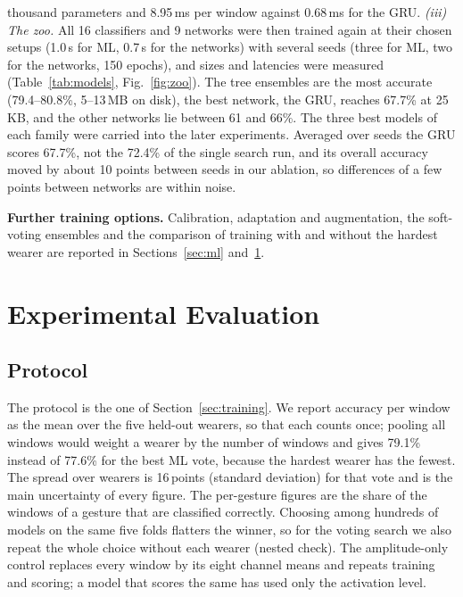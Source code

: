 \documentclass[conference]{IEEEtran}
\begin{document}
thousand parameters and 8.95\,ms per window against 0.68\,ms for the GRU.
\emph{(iii) The zoo.} All 16 classifiers and 9 networks were then trained again at
their chosen setups (1.0\,s for ML, 0.7\,s for the networks) with several seeds
(three for ML, two for the networks, 150 epochs), and sizes and latencies were
measured (Table~\ref{tab:models}, Fig.~\ref{fig:zoo}). The tree ensembles are the
most accurate (79.4--80.8\%, 5--13\,MB on disk), the best network, the GRU, reaches
67.7\% at 25\,KB, and the other networks lie between 61 and 66\%. The three best
models of each family were carried into the later experiments. Averaged over seeds
the GRU scores 67.7\%, not the 72.4\% of the single search run, and its overall
accuracy moved by about 10 points between seeds in our ablation, so differences of
a few points between networks are within noise.

\textbf{Further training options.} Calibration, adaptation and augmentation, the
soft-voting ensembles and the comparison of training with and without the hardest
wearer are reported in Sections~\ref{sec:ml} and~\ref{sec:experiments}.

\section{Experimental Evaluation}
\label{sec:experiments}
\subsection{Protocol}
The protocol is the one of Section~\ref{sec:training}. We report accuracy per
window as the mean over the five held-out wearers, so that each counts once;
pooling all windows would weight a wearer by the number of windows and gives 79.1\%
instead of 77.6\% for the best ML vote, because the hardest wearer has the fewest.
The spread over wearers is 16\,points (standard deviation) for that vote and is
the main uncertainty of every figure. The per-gesture figures are the share of the
windows of a gesture that are classified correctly. Choosing among hundreds of
models on the same five folds flatters the winner, so for the voting search we also
repeat the whole choice without each wearer (nested check). The amplitude-only
control replaces every window by its eight channel means and repeats training and
scoring; a model that scores the same has used only the activation level.
\end{document}
